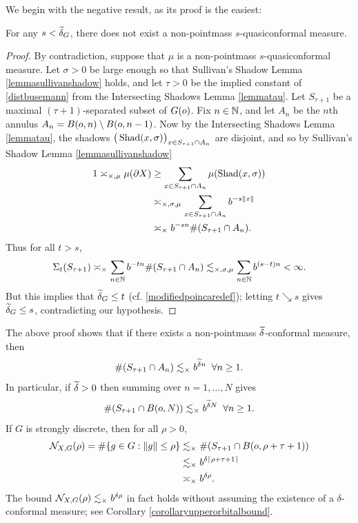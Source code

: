 We begin with the negative result, as its proof is the easiest:
\begin{proposition}
\label{propositionlessthandelta}
For any $s < \widetilde\delta_G$, there does not exist a non-pointmass $s$-quasiconformal measure.
\end{proposition}
\begin{proof}
By contradiction, suppose that $\mu$ is a non-pointmass $s$-quasiconformal measure. Let $\sigma > 0$ be large enough so that Sullivan's Shadow Lemma \ref{lemmasullivanshadow} holds, and let $\tau > 0$ be the implied constant of \eqref{distbusemann} from the Intersecting Shadows Lemma \ref{lemmatau}. Let $S_{\tau + 1}$ be a maximal $(\tau + 1)$-separated subset of $G(o)$. Fix $n\in\N$, and let $A_n$ be the $n$th annulus $A_n = B(o,n)\setminus B(o,n - 1)$. Now by the Intersecting Shadows Lemma \ref{lemmatau}, the shadows $\big(\operatorname{Shad}(x,\sigma)\big)_{x\in S_{\tau + 1}\cap A_n}$ are disjoint, and so by Sullivan's Shadow Lemma \ref{lemmasullivanshadow}
\begin{align*}
1 \asymp_{\times,\mu} \mu(\partial X)
&\geq
\sum_{x\in S_{\tau + 1}\cap A_n}\mu(\operatorname{Shad}(x,\sigma))\\
&\asymp_{\times,\sigma,\mu} \sum_{x\in S_{\tau + 1}\cap A_n}b^{-s\|x\|}\\
& \asymp_{\times}
b^{-sn}\#(S_{\tau + 1}\cap A_n).
\end{align*}
Thus for all $t > s$,
\[
\Sigma_t(S_{\tau + 1})
\asymp_\times \sum_{n\in\N} b^{-tn}\#(S_{\tau + 1}\cap A_n)
\lesssim_{\times,\sigma,\mu} \sum_{n\in\N}b^{(s - t)n} < \infty.
\]
But this implies that $\widetilde\delta_G\leq t$ (cf. \eqref{modifiedpoincaredef}); letting $t\searrow s$ gives $\widetilde\delta_G\leq s$, contradicting our hypothesis.
\end{proof}

\begin{remark}
\label{remarkupperorbitalbound}
The above proof shows that if there exists a non-pointmass $\widetilde\delta$-conformal measure, then
\[
\#(S_{\tau + 1}\cap A_n) \lesssim_\times b^{\widetilde\delta n} \;\;\forall n\geq 1.
\]
In particular, if $\widetilde\delta > 0$ then summing over $n = 1,\ldots,N$ gives
\[
\#(S_{\tau + 1}\cap B(o,N)) \lesssim_\times b^{\widetilde\delta N} \;\;\forall n\geq 1.
\]
If $G$ is strongly discrete, then for all $\rho > 0$,
\begin{align*}
\mathcal N_{X,G}(\rho) = \#\{g\in G : \|g\| \leq \rho\} 
&\lesssim_\times \#(S_{\tau + 1}\cap B(o,\rho + \tau + 1))\\
&\lesssim_\times b^{\delta\lceil\rho + \tau + 1\rceil}\\
&\asymp_\times b^{\delta\rho}.
\end{align*}
The bound $\mathcal N_{X,G}(\rho) \lesssim_\times b^{\delta\rho}$ in fact holds without assuming the existence of a $\delta$-conformal measure; see Corollary \ref{corollaryupperorbitalbound}.
\end{remark}

